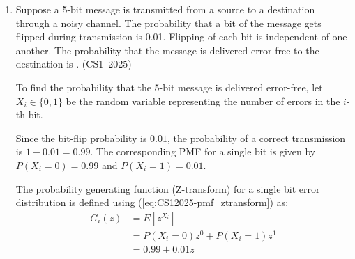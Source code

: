 \begin{enumerate}[label=\thesubsection.\arabic*, ref=\thesubsection.\theenumi]
\vspace{0.2cm}
\begin{center}




\end{center}

\vspace{0.3cm}
\begin{lstlisting}[language=SQL]
SELECT MIN (P.age)
FROM player P
WHERE P.pid IN (
    SELECT M.pid
    FROM team T, coach C, members M
    WHERE C.cname = 'Mark'
      AND T.cid = C.cid
      AND M.tid = T.tid
)
\end{lstlisting}
The value returned by the given SQL query is \underline{\hspace{1cm}}.
\hfill (CS1~2025)

\vspace{0.2cm}
\solution
Coach 'Mark' has \texttt{cid = 102}, corresponding to team \texttt{tid = 10}. Players in team 10 are \texttt{pid = 1} (age 31) and \texttt{pid = 3} (age 26). The minimum age is $\min(31, 26) = 26$.

\vspace{0.5cm}
\item Suppose a 5-bit message is transmitted from a source to a destination through a noisy channel. The probability that a bit of the message gets flipped during transmission is 0.01. Flipping of each bit is independent of one another. The probability that the message is delivered error-free to the destination is \underline{\hspace{1cm}}.
\hfill (CS1~2025)

\vspace{0.2cm}
\solution
To find the probability that the 5-bit message is delivered error-free, let $X_i \in \{0, 1\}$ be the random variable representing the number of errors in the $i$-th bit.

Since the bit-flip probability is $0.01$, the probability of a correct transmission is $1 - 0.01 = 0.99$. The corresponding PMF for a single bit is given by $P(X_i = 0) = 0.99$ and $P(X_i = 1) = 0.01$.

The probability generating function (Z-transform) for a single bit error distribution is defined using (\ref{eq:CS12025-pmf_ztransform}) as:
\begin{align}
G_i(z) &= E[z^{X_i}] \\
       &= P(X_i = 0)z^0 + P(X_i = 1)z^1 \\
       &= 0.99 + 0.01z
\end{align}


\end{enumerate}
